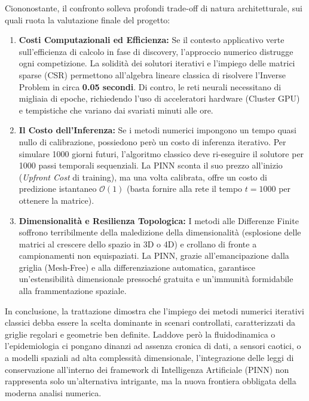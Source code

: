 \documentclass[12pt,a4paper]{article}
\begin{document}
Ciononostante, il confronto solleva profondi trade-off di natura architetturale, sui quali ruota la valutazione finale del progetto:
\begin{enumerate}
    \item \textbf{Costi Computazionali ed Efficienza:} Se il contesto applicativo verte sull'efficienza di calcolo in fase di discovery, l'approccio numerico distrugge ogni competizione. La solidità dei solutori iterativi e l'impiego delle matrici sparse (CSR) permettono all'algebra lineare classica di risolvere l'Inverse Problem in circa \textbf{0.05 secondi}. Di contro, le reti neurali necessitano di migliaia di epoche, richiedendo l'uso di acceleratori hardware (Cluster GPU) e tempistiche che variano dai svariati minuti alle ore.
    \item \textbf{Il Costo dell'Inferenza:} Se i metodi numerici impongono un tempo quasi nullo di calibrazione, possiedono però un costo di inferenza iterativo. Per simulare 1000 giorni futuri, l'algoritmo classico deve ri-eseguire il solutore per 1000 passi temporali sequenziali. La PINN sconta il suo prezzo all'inizio (\textit{Upfront Cost} di training), ma una volta calibrata, offre un costo di predizione istantaneo $\mathcal{O}(1)$ (basta fornire alla rete il tempo $t=1000$ per ottenere la matrice).
    \item \textbf{Dimensionalità e Resilienza Topologica:} I metodi alle Differenze Finite soffrono terribilmente della maledizione della dimensionalità (esplosione delle matrici al crescere dello spazio in 3D o 4D) e crollano di fronte a campionamenti non equispaziati. La PINN, grazie all'emancipazione dalla griglia (Mesh-Free) e alla differenziazione automatica, garantisce un'estensibilità dimensionale pressoché gratuita e un'immunità formidabile alla frammentazione spaziale.
\end{enumerate}

In conclusione, la trattazione dimostra che l'impiego dei metodi numerici iterativi classici debba essere la scelta dominante in scenari controllati, caratterizzati da griglie regolari e geometrie ben definite. Laddove però la fluidodinamica o l'epidemiologia ci pongano dinanzi ad assenza cronica di dati, a sensori caotici, o a modelli spaziali ad alta complessità dimensionale, l'integrazione delle leggi di conservazione all'interno dei framework di Intelligenza Artificiale (PINN) non rappresenta solo un'alternativa intrigante, ma la nuova frontiera obbligata della moderna analisi numerica.
\end{document}
